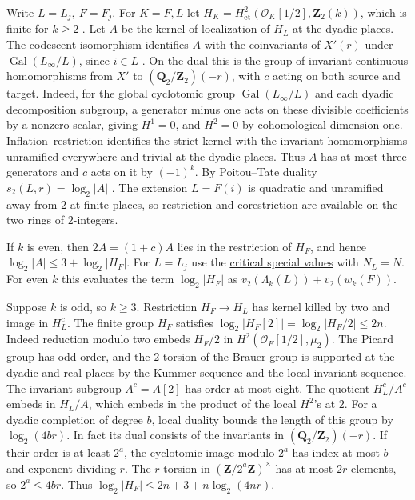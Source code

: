 Write \(L=L_j,\ F=F_j\). For \(K=F,L\) let
\(H_K=H^2_{\mathrm{\acute et}}(\mathcal O_K[1/2],\mathbf Z_2(k))\),
which is finite for \(k\ge2\)
\cite[VI, \S8]{f1weibel-kbook}\cite{f2-kolster-relative}.
Let \(A\) be the kernel of localization of \(H_L\) at the dyadic
places. The codescent isomorphism identifies \(A\) with the
coinvariants of \(X'(r)\) under \(\operatorname{Gal}(L_\infty/L)\),
since \(i\in L\) \cite[Theorem~3.1]{f2-validire}. On the dual this
is the group of invariant continuous homomorphisms from \(X'\) to
\((\mathbf Q_2/\mathbf Z_2)(-r)\), with \(c\) acting on both source
and target. Indeed, for the global cyclotomic group
\(\operatorname{Gal}(L_\infty/L)\) and each dyadic decomposition
subgroup, a generator minus one acts on these divisible coefficients
by a nonzero scalar, giving \(H^1=0\), and \(H^2=0\) by cohomological
dimension one. Inflation--restriction identifies the strict
kernel with the invariant homomorphisms unramified everywhere and
trivial at the dyadic places. Thus \(A\) has at most three generators and \(c\)
acts on it by \((-1)^k\).
By Poitou--Tate duality \(s_2(L,r)=\log_2|A|\)
\cite[Theorem~I.4.10(a)]{f1milne-adt}.
The extension \(L=F(i)\) is quadratic and unramified away from \(2\)
at finite places, so restriction and corestriction are available on the
two rings of \(2\)-integers.

If \(k\) is even, then \(2A=(1+c)A\) lies in the restriction of
\(H_F\), and hence \(\log_2|A|\le3+\log_2|H_F|\).
For \(L=L_j\) use the
\hyperlink{proof.shared-critical-selmer-values}{critical special values}
with \(N_L=N\). For even \(k\) this evaluates the term
\(\log_2|H_F|\) as \(v_2(\Lambda_k(L))+v_2(w_k(F))\).

Suppose \(k\) is odd, so \(k\ge3\). Restriction \(H_F\to H_L\)
has kernel killed by two and image in \(H_L^c\).
The finite group \(H_F\) satisfies
\(\log_2|H_F[2]|=\log_2|H_F/2|\le2n\). Indeed reduction modulo two
embeds \(H_F/2\) in \(H^2(\mathcal O_F[1/2],\mu_2)\).
The Picard group has odd order, and the \(2\)-torsion of the Brauer
group is supported at the dyadic and real places by the Kummer
sequence and the local invariant sequence.
The invariant subgroup \(A^c=A[2]\) has order at most eight.
The quotient \(H_L^c/A^c\) embeds in \(H_L/A\), which embeds
in the product of the local \(H^2\)'s at \(2\).
For a dyadic completion of degree \(b\), local duality bounds the
length of this group by \(\log_2(4br)\). In fact its dual consists
of the invariants in \((\mathbf Q_2/\mathbf Z_2)(-r)\).
If their order is at least \(2^a\), the cyclotomic image modulo
\(2^a\) has index at most \(b\) and exponent dividing \(r\).
The \(r\)-torsion in \((\mathbf Z/2^a\mathbf Z)^\times\) has at
most \(2r\) elements, so \(2^a\le4br\). Thus
\(\log_2|H_F|\le 2n+3+n\log_2(4nr)\).

